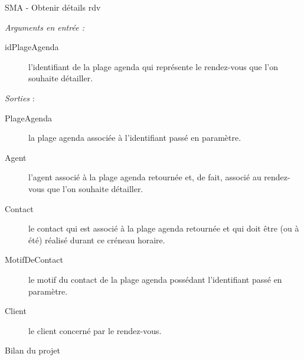 \documentclass[xetex]{beamer}
\begin{document}
    \begin{frame}{SMA - Obtenir détails rdv}

\begin{small}
\noindent \textit{Arguments en entrée :}
\begin{description}
\item[idPlageAgenda] l'identifiant de la plage agenda qui représente le rendez-vous que l'on souhaite détailler. \\
\end{description}

\noindent \textit{Sorties} : 
\begin{description}
\item[PlageAgenda] la plage agenda associée à l'identifiant passé en paramètre. 
\item[Agent] l'agent associé à la plage agenda retournée et, de fait, associé au rendez-vous que l'on souhaite détailler. 
\item[Contact] le contact qui est associé à la plage agenda retournée et qui doit être (ou à été) réalisé durant ce créneau horaire.
\item[MotifDeContact] le motif du contact de la plage agenda possédant l'identifiant passé en paramètre. 
\item[Client] le client concerné par le rendez-vous. \\
\end{description}
\end{small}
    \end{frame}
    
    \begin{frame}{Bilan du projet}
  \begin{figure}
	
  \end{figure}
\end{frame}
\end{document}
